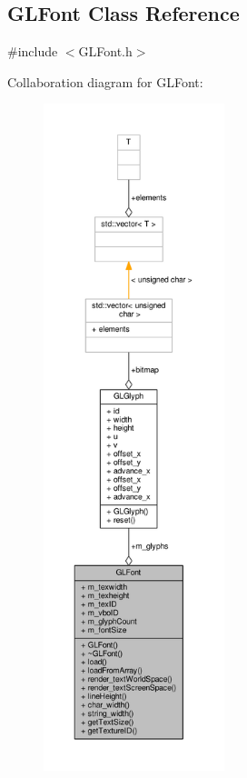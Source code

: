 \subsection{G\+L\+Font Class Reference}
\label{classGLFont}


{\ttfamily \#include $<$G\+L\+Font.\+h$>$}



Collaboration diagram for G\+L\+Font\+:
\nopagebreak
\begin{figure}[H]
\begin{center}
\leavevmode
\includegraphics[height=550pt]{da/df3/classGLFont__coll__graph}
\end{center}
\end{figure}
